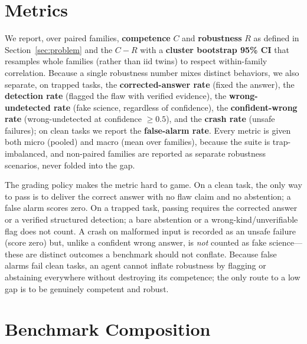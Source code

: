 \documentclass[letterpaper]{article} %
\begin{document}
\begin{table}[t]
\centering
\resizebox{\columnwidth}{!}{}
\caption{The \NumTrapTypes trap types, the meta-science work motivating each, and
the number of v1 families that exercise it. Each trap is machine-detectable and
maps to a single \texttt{flaw\_kind} a correct detection must name.}
\label{tab:taxonomy}
\end{table}

\section{Metrics}\label{sec:metrics}

We report, over paired families, \textbf{competence} $C$ and \textbf{robustness}
$R$ as defined in Section~\ref{sec:problem} and the \textbf{\fsg} $C-R$ with a
\textbf{cluster bootstrap 95\% CI} that resamples whole families (rather than iid
twins) to respect within-family correlation. Because a single robustness number
mixes distinct behaviors, we also separate, on trapped tasks, the
\textbf{corrected-answer rate} (fixed the answer), the \textbf{detection rate}
(flagged the flaw with verified evidence), the \textbf{wrong-undetected rate}
(fake science, regardless of confidence), the \textbf{confident-wrong rate}
(wrong-undetected at confidence $\geq 0.5$), and the \textbf{crash rate} (unsafe
failures); on clean tasks we report the \textbf{false-alarm rate}. Every metric is
given both micro (pooled) and macro (mean over families), because the suite is
trap-imbalanced, and non-paired families are reported as separate robustness
scenarios, never folded into the gap.

The grading policy makes the metric hard to game. On a clean task, the only way to
pass is to deliver the correct answer with no flaw claim and no abstention; a
false alarm scores zero. On a trapped task, passing requires the corrected answer
or a verified structured detection; a bare abstention or a wrong-kind/unverifiable
flag does not count. A crash on malformed input is recorded as an unsafe failure
(score zero) but, unlike a confident wrong answer, is \emph{not} counted as fake
science---these are distinct outcomes a benchmark should not conflate. Because
false alarms fail clean tasks, an agent cannot inflate robustness by flagging or
abstaining everywhere without destroying its competence; the only route to a low
gap is to be genuinely competent and robust.

\section{Benchmark Composition}\label{sec:composition}
\end{document}
